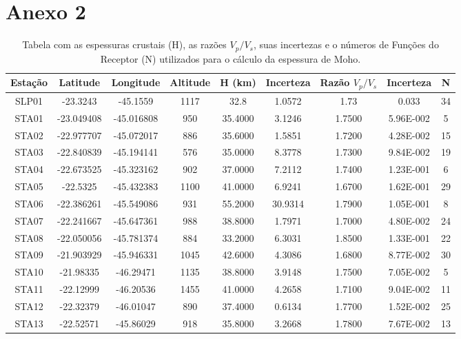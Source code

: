 \chapter*{Anexo 2}
\begin{landscape}
\begin{table}[!Ht]
\caption{Tabela com as espessuras crustais (H), as razões $V_{p}/V_{s}$, suas incertezas e o números de Funções do Receptor (N) utilizados para o cálculo da espessura de Moho.}
\begin{center}
\begin{tabular}{| c | c | c | c | c | c | c | c | c |}
\hline
{\textbf{Estação}} & {\textbf{Latitude}} & {\textbf{Longitude}} & {\textbf{Altitude}} & {\textbf{H (km)}} & {\textbf{Incerteza}} & {\textbf{Razão $V_{p}/V_{s}$}} & {\textbf{Incerteza}} & {\textbf{N}}\\
\hline 
SLP01 & -23.3243 & -45.1559 & 1117 & 32.8 & 1.0572 & 1.73 & 0.033 & 34\\
STA01 & -23.049408 & -45.016808 & 950 & 35.4000 & 3.1246 & 1.7500 & 5.96E-002 & 5\\
STA02 & -22.977707 & -45.072017 & 886 & 35.6000 & 1.5851 & 1.7200 & 4.28E-002 & 15\\
STA03 & -22.840839 & -45.194141 & 576 & 35.0000 & 8.3778 & 1.7300 & 9.84E-002 & 19\\
STA04 & -22.673525 & -45.323162 & 902 & 37.0000 & 7.2112 & 1.7400 & 1.23E-001 & 6\\
STA05 & -22.5325 & -45.432383 & 1100 & 41.0000 & 6.9241 & 1.6700 & 1.62E-001 & 29\\
STA06 & -22.386261 & -45.549086 & 931 & 55.2000 & 30.9314 & 1.7900 & 1.05E-001 & 8\\
STA07 & -22.241667 & -45.647361 & 988 & 38.8000 & 1.7971 & 1.7000 & 4.80E-002 & 24\\
STA08 & -22.050056 & -45.781374 & 884 & 33.2000 & 6.3031 & 1.8500 & 1.33E-001 & 22\\
STA09 & -21.903929 & -45.946331 & 1045 & 42.6000 & 4.3086 & 1.6800 & 8.77E-002 & 30\\
STA10 & -21.98335 & -46.29471 & 1135 & 38.8000 & 3.9148 & 1.7500 & 7.05E-002 & 5\\
STA11 & -22.12999 & -46.20536 & 1455 & 41.0000 & 4.2658 & 1.7100 & 9.04E-002 & 11\\
STA12 & -22.32379 & -46.01047 & 890 & 37.4000 & 0.6134 & 1.7700 & 1.52E-002 & 25\\
STA13 & -22.52571 & -45.86029 & 918 & 35.8000 & 3.2668 & 1.7800 & 7.67E-002 & 13\\

\end{tabular}
\end{center}
\end{table}
\end{landscape}
